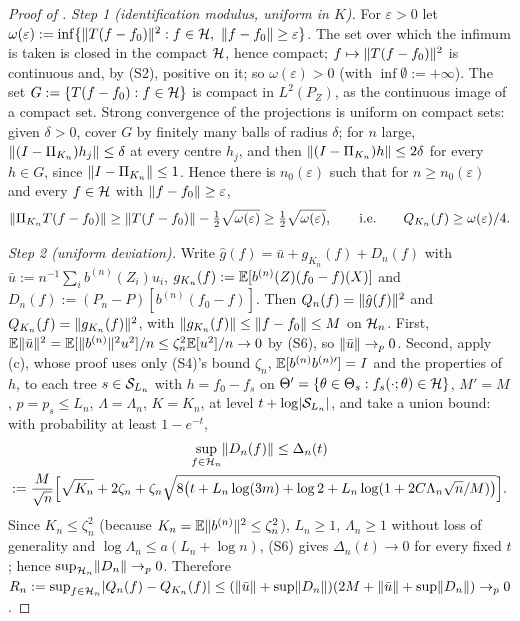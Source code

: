 \begin{proof}[Proof of ]
\emph{Step 1 (identification modulus, uniform in $K$).} For $\varepsilon > 0$ let $\omega(\varepsilon) := \inf\{\lVert T(f - f_0)\rVert^2 : f \in \mathcal{H},\ \lVert f - f_0\rVert \ge \varepsilon\}$. The set over which the infimum is taken is closed in the compact $\mathcal{H}$, hence compact; $f \mapsto \lVert T(f - f_0)\rVert^2$ is continuous and, by (S2), positive on it; so $\omega(\varepsilon) > 0$ (with $\inf\emptyset := +\infty$). The set $G := \{T(f - f_0) : f \in \mathcal{H}\}$ is compact in $L^2(P_Z)$, as the continuous image of a compact set. Strong convergence of the projections is uniform on compact sets: given $\delta > 0$, cover $G$ by finitely many balls of radius $\delta$; for $n$ large, $\lVert (I - \Pi_{K_n})h_j\rVert \le \delta$ at every centre $h_j$, and then $\lVert (I - \Pi_{K_n})h\rVert \le 2\delta$ for every $h \in G$, since $\lVert I - \Pi_{K_n}\rVert \le 1$. Hence there is $n_0(\varepsilon)$ such that for $n \ge n_0(\varepsilon)$ and every $f \in \mathcal{H}$ with $\lVert f - f_0\rVert \ge \varepsilon$,
\begin{equation}
\lVert \Pi_{K_n}T(f - f_0)\rVert \ge \lVert T(f - f_0)\rVert - \tfrac12\sqrt{\omega(\varepsilon)} \ge \tfrac12\sqrt{\omega(\varepsilon)}, \qquad\text{i.e.}\qquad Q_{K_n}(f) \ge \omega(\varepsilon)/4.
\label{eq:modulus}
\end{equation}

\emph{Step 2 (uniform deviation).} Write $\hat g(f) = \bar u + g_{K_n}(f) + D_n(f)$ with $\bar u := n^{-1}\sum_ib^{(n)}(Z_i)u_i$, $g_{K_n}(f) := \mathbb{E}[b^{(n)}(Z)(f_0 - f)(X)]$ and $D_n(f) := (P_n - P)[b^{(n)}(f_0 - f)]$. Then $Q_n(f) = \lVert \hat g(f)\rVert^2$ and $Q_{K_n}(f) = \lVert g_{K_n}(f)\rVert^2$, with $\lVert g_{K_n}(f)\rVert \le \lVert f - f_0\rVert \le M$ on $\mathcal{H}_n$. First, $\mathbb{E}\lVert \bar u\rVert^2 = \mathbb{E}[\lVert b^{(n)}\rVert^2u^2]/n \le \zeta_n^2\mathbb{E}[u^2]/n \to 0$ by (S6), so $\lVert \bar u\rVert \to_p 0$. Second, apply (c), whose proof uses only (S4)'s bound $\zeta_n$, $\mathbb{E}[b^{(n)}b^{(n)\prime}] = I$ and the properties of $h$, to each tree $s \in \mathcal{S}_{L_n}$ with $h = f_0 - f_s$ on $\Theta' = \{\theta \in \Theta_s : f_s(\cdot;\theta) \in \mathcal{H}\}$, $M' = M$, $p = p_s \le L_n$, $\Lambda = \Lambda_n$, $K = K_n$, at level $t + \log\lvert \mathcal{S}_{L_n}\rvert$, and take a union bound: with probability at least $1 - e^{-t}$,
\begin{multline*}
\sup_{f \in \mathcal{H}_n}\lVert D_n(f)\rVert \le \Delta_n(t) \\ := \frac{M}{\sqrt n}\Bigl[\sqrt{K_n} + 2\zeta_n + \zeta_n\sqrt{8\bigl(t + L_n\log(3m) + \log 2 + L_n\log(1 + 2C\Lambda_n\sqrt n/M)\bigr)}\Bigr].
\end{multline*}
Since $K_n \le \zeta_n^2$ (because $K_n = \mathbb{E}\lVert b^{(n)}\rVert^2 \le \zeta_n^2$), $L_n \ge 1$, $\Lambda_n \ge 1$ without loss of generality and $\log\Lambda_n \le a(L_n + \log n)$, (S6) gives $\Delta_n(t) \to 0$ for every fixed $t$; hence $\sup_{\mathcal{H}_n}\lVert D_n\rVert \to_p 0$. Therefore $R_n := \sup_{f \in \mathcal{H}_n}\lvert Q_n(f) - Q_{K_n}(f)\rvert \le (\lVert \bar u\rVert + \sup\lVert D_n\rVert)(2M + \lVert \bar u\rVert + \sup\lVert D_n\rVert) \to_p 0$.


\end{proof}
